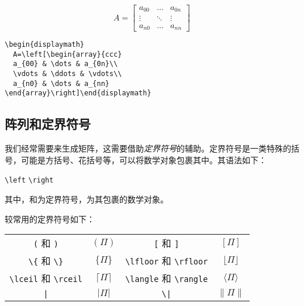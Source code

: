 \begin{codelist}[3.15]{
  \begin{displaymath} A=\left[\begin{array}{ccc}
    a_{00} & \dots & a_{0n}\\
    \vdots & \ddots & \vdots\\
    a_{n0} & \dots & a_{nn}
  \end{array}\right]\end{displaymath}
}
\begin{verbatim}
\begin{displaymath} 
  A=\left[\begin{array}{ccc}
  a_{00} & \dots & a_{0n}\\
  \vdots & \ddots & \vdots\\
  a_{n0} & \dots & a_{nn}
\end{array}\right]\end{displaymath}\end{verbatim}
\end{codelist}

\subsection{阵列和定界符号}

我们经常需要来生成矩阵，这需要借助\emph{定界符号}的辅助。定界符号是一类特殊的括号，可能是方括号、花括号等，可以将数学对象包裹其中。其语法如下：

\begin{dmd}
\verb|\left|  \verb|\right|
\end{dmd}

其中，和为定界符号，为其包裹的数学对象。

较常用的定界符号如下：

\begin{center}
  \begin{tabular}{cccc}
    \verb+(+ 和 \verb+)+               & $(\Pi)$             &
    \verb+[+ 和 \verb+]+               & $[\Pi]$             \\
    \verb+\{+ 和 \verb+\}+             & $\{\Pi\}$           &
    \verb|\lfloor| 和 \verb|\rfloor| & $\lfloor\Pi\rfloor$ \\
    \verb|\lceil| 和 \verb|\rceil|   & $\lceil\Pi\rceil$   &
    \verb|\langle| 和 \verb|\rangle| & $\langle\Pi\rangle$  \\
    \verb+|+                           & $|\Pi|$             &
    \verb+\|+                         & $\|\Pi\|$           
  \end{tabular}
\end{center}

